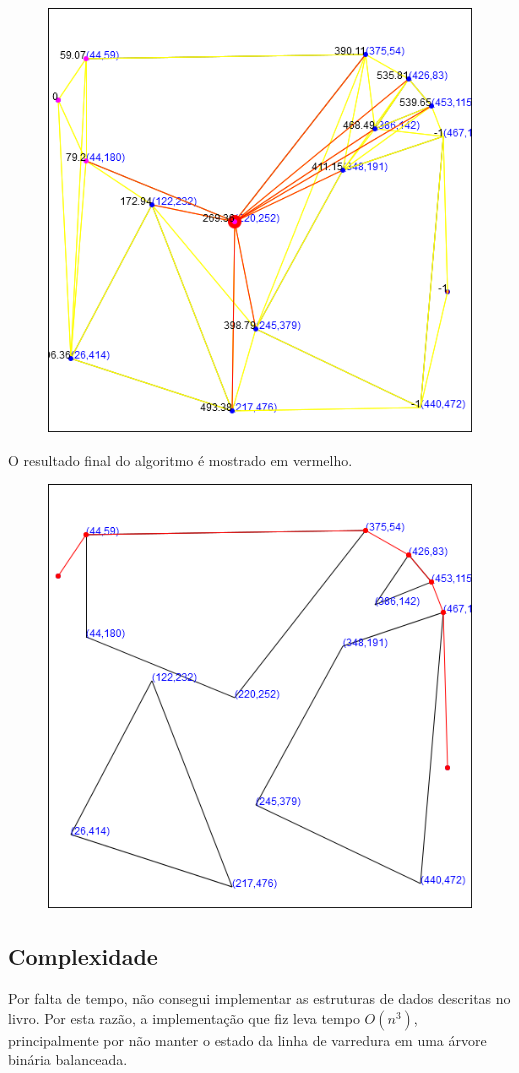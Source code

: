 \documentclass[11pt]{article} %
\begin{document}
\begin{figure}[!htp]
	\begin{center}
		\includegraphics[scale=0.5]{img/dijkstra.png}
	\end{center}	
\end{figure}

\newpage

O resultado final do algoritmo é mostrado em vermelho.

\begin{figure}[!htp]
	\begin{center}
		\includegraphics[scale=0.5]{img/final.png}
	\end{center}	
\end{figure}


\subsection{Complexidade}

Por falta de tempo, não consegui implementar as estruturas de dados descritas no livro. Por esta razão, a implementação que fiz leva tempo $O(n^3)$, principalmente por não manter o estado da linha de varredura em uma árvore binária balanceada.
\end{document}
